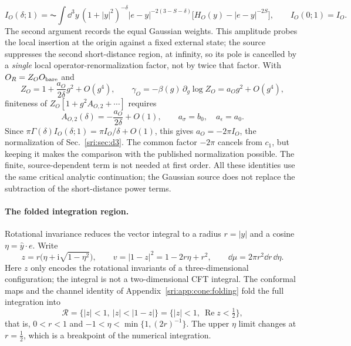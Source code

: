 \begin{equation}
 I_O(\delta;1)=\AC\!\int\dd^3y\,(1+|y|^2)^{-\delta}|e-y|^{-2(3-S-\delta)}\bigl[H_O(y)-|e-y|^{-2S}\bigr],
 \qquad I_O(0;1)=I_O .
 \label{sri:eq:cone:Ireg}
\end{equation}
The second argument records the equal Gaussian weights. This amplitude probes the local insertion at the origin
against a fixed external state; the source suppresses the second short-distance region, at infinity, so its pole is
cancelled by a \emph{single} local operator-renormalization factor, not by twice that factor. With $O_R=Z_OO_{\rm bare}$
and
\begin{equation}
 Z_O=1+\frac{a_O}{2\delta}g^2+O(g^4),\qquad \gamma_O=-\beta(g)\,\partial_g\log Z_O=a_Og^2+O(g^4),
\end{equation}
finiteness of $Z_O[1+g^2A_{O,2}+\cdots]$ requires
\begin{equation}
 A_{O,2}(\delta)=-\frac{a_O}{2\delta}+O(1),\qquad a_\sigma=b_0,\quad a_\epsilon=a_0 .
\end{equation}
Since $\pi\Gamma(\delta)I_O(\delta;1)=\pi I_O/\delta+O(1)$, this gives $a_O=-2\pi I_O$, the normalization of
Sec.~\ref{sri:sec:d3}. The common factor $-2\pi$ cancels from $c_1$, but keeping it makes the comparison with the
published normalization possible. The finite, source-dependent term is not needed at first order. All these identities
use the same critical analytic continuation; the Gaussian source does not replace the subtraction of the
short-distance power terms.

\paragraph{The folded integration region.} Rotational invariance reduces the vector integral to a radius $r=|y|$ and a
cosine $\eta=\widehat y\cdot e$. Write
\begin{equation}
 z=r\bigl(\eta+\mathrm i\sqrt{1-\eta^2}\bigr),\qquad v=|1-z|^2=1-2r\eta+r^2,\qquad \dd\mu=2\pi r^2\dd r\,\dd\eta .
\end{equation}
Here $z$ only encodes the rotational invariants of a three-dimensional configuration; the integral is not a
two-dimensional CFT integral. The conformal maps and the channel identity of Appendix~\ref{sri:app:cone:folding} fold the full
integration into
\begin{equation}
 \mathcal R=\{|z|<1,\ |z|<|1-z|\}=\{|z|<1,\ \operatorname{Re}z<\tfrac12\},
 \label{sri:eq:cone:region}
\end{equation}
that is, $0<r<1$ and $-1<\eta<\min\{1,(2r)^{-1}\}$. The upper $\eta$ limit changes at $r=\frac12$, which is a breakpoint
of the numerical integration.

